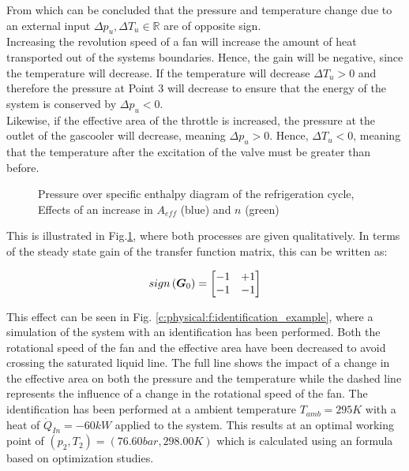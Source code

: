 From which can be concluded that the pressure and temperature change due to an external input $\Delta p_u, \Delta T_u \in \mathbb{R}$ are of opposite sign. \\

Increasing the revolution speed of a fan will increase the amount of heat transported out of the systems boundaries. Hence, the gain will be negative, since the temperature will decrease. If the temperature will decrease $\Delta T_u > 0$ and therefore the pressure at Point 3 will decrease to ensure that the energy of the system is conserved by $\Delta p_u < 0$.\\

Likewise, if the effective area of the throttle is increased, the pressure at the outlet of the gascooler will decrease, meaning $\Delta p_u > 0$. Hence, $\Delta T_u < 0$, meaning that the temperature after the excitation of the valve must be greater than before.\\

\begin{figure}[H]

\caption{Pressure over specific enthalpy diagram of the refrigeration cycle, Effects of an increase in $A_{eff}$ (blue) and $n$ (green) }
\label{c:physical:f:ph2}
\end{figure}

This is illustrated in Fig.\ref{c:physical:f:ph2}, where both processes are given qualitatively. In terms of the steady state gain of the transfer function matrix, this can be written as:

\begin{align*}
sign\left(\mbox{\boldmath$G$}_0 \right)
= \begin{bmatrix}
-1 & +1 \\
-1 & -1 
\end{bmatrix}
\end{align*}

This effect can be seen in Fig. \ref{c:physical:f:identification_example}, where a simulation of the system with an identification has been performed. Both the rotational speed of the fan and the effective area have been decreased to avoid crossing the saturated liquid line. The full line shows the impact of a change in the effective area on both the pressure and the temperature while the dashed line represents the influence of a change in the rotational speed of the fan. The identification has been performed at a ambient temperature $T_{amb} = 295 K $ with a heat of $\dot{Q}_{In} = -60 kW$ applied to the system. This results at an optimal working point of $\left( p_2, T_2 \right) = \left( 76.60 bar , 298.00 K\right)$ which is calculated using an formula based on optimization studies.

